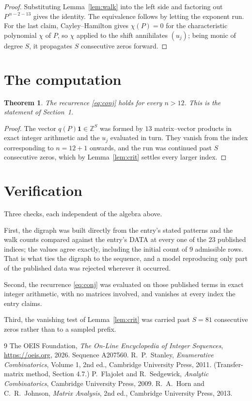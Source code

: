 \documentclass[11pt,a4paper]{article}
\theoremstyle{plain}
\newtheorem{theorem}{Theorem}
\theoremstyle{definition}
\begin{document}
\begin{proof}
Substituting Lemma~\ref{lem:walk} into the left side and factoring out
$P^{\,n-2-13}$ gives the identity. The equivalence follows by letting the exponent
run. For the last claim, Cayley--Hamilton gives $\chi(P)=0$ for the characteristic
polynomial $\chi$ of $P$, so $\chi$ applied to the shift annihilates $(u_j)$; being monic of
degree $S$, it propagates $S$ consecutive zeros forward.
\end{proof}

\section{The computation}

\begin{theorem}
The recurrence \eqref{eq:conj} holds for every $n>12$. This is the statement of
Section~1.
\end{theorem}

\begin{proof}
The vector $q(P)\mathbf{1}\in\mathbb{Z}^{S}$ was formed by $13$ matrix--vector
products in exact integer arithmetic and the $u_j$ evaluated in turn. They vanish from the
index corresponding to $n=12+1$ onwards, and the run was continued past $S$ consecutive
zeros, which by Lemma~\ref{lem:crit} settles every larger index.
\end{proof}

\section{Verification}

Three checks, each independent of the algebra above.

First, the digraph was built directly from the entry's stated patterns and the walk counts
compared against the entry's DATA at every one of the $23$ published indices; the
values agree exactly, including the initial count of $9$ admissible rows. That is
what ties the digraph to the sequence, and a model reproducing only part of the published
data was rejected wherever it occurred.

Second, the recurrence \eqref{eq:conj} was evaluated on those published terms in exact
integer arithmetic, with no matrices involved, and vanishes at every index the entry claims.

Third, the vanishing test of Lemma~\ref{lem:crit} was carried past $S=81$ consecutive
zeros rather than to a sampled prefix.

\begin{thebibliography}{9}
 The OEIS Foundation, \emph{The On-Line Encyclopedia of Integer
Sequences}, \url{https://oeis.org}, 2026. Sequence A207560.
 R.~P.~Stanley, \emph{Enumerative Combinatorics}, Volume 1, 2nd ed.,
Cambridge University Press, 2011. (Transfer-matrix method, Section 4.7.)
 P.~Flajolet and R.~Sedgewick, \emph{Analytic Combinatorics}, Cambridge
University Press, 2009.
 R.~A.~Horn and C.~R.~Johnson, \emph{Matrix Analysis}, 2nd ed., Cambridge
University Press, 2013.
\end{thebibliography}
\end{document}
